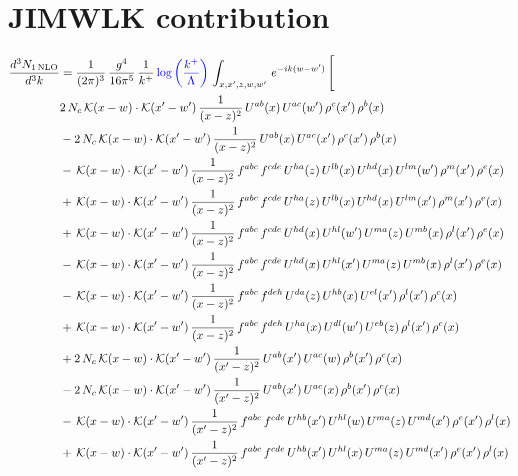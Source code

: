 \documentclass[9pt]{article}
\numberwithin{equation}{section}
\begin{document}
\section{JIMWLK contribution}
\begin{align}
\frac{d^{3}N_{1\,\mathrm{NLO}}}{d^{3}k} & = \frac{1}{(2\pi)^{3}}\,\frac{g^{4}}{16\pi^{5}}\,\frac{1}{k^{+}}\,{\color{blue}\log{\left(\frac{k^{+}}{\Lambda}\right)}}\,\int_{x,x',z,w,w'}\,e^{-ik(w-w')}\,\Bigg[\notag\\
&2\,N_{c}\,\mathcal{K}(x-w)\cdot\mathcal{K}(x'-w')\,\frac{1}{(x-z)^{2}}\,U^{ab}(x)\,U^{ac}(w')\,\rho^{c}(x')\,\rho^{b}(x)\notag\\
&-2\,N_{c}\,\mathcal{K}(x-w)\cdot\mathcal{K}(x'-w')\,\frac{1}{(x-z)^{2}}\,U^{ab}(x)\,U^{ac}(x')\,\rho^{c}(x')\,\rho^{b}(x)\notag\\
&-\,\mathcal{K}(x-w)\cdot\mathcal{K}(x'-w')\,\frac{1}{(x-z)^{2}}\,f^{abc}\,f^{cde}\,U^{ha}(z)\,U^{lb}(x)\,U^{hd}(x)\,U^{lm}(w')\,\rho^{m}(x')\,\rho^{e}(x)\notag\\
&+\,\mathcal{K}(x-w)\cdot\mathcal{K}(x'-w')\,\frac{1}{(x-z)^{2}}\,f^{abc}\,f^{cde}\,U^{ha}(z)\,U^{lb}(x)\,U^{hd}(x)\,U^{lm}(x')\,\rho^{m}(x')\,\rho^{e}(x)\notag\\
&+\,\mathcal{K}(x-w)\cdot\mathcal{K}(x'-w')\,\frac{1}{(x-z)^{2}}\,f^{abc}\,f^{cde}\,U^{hd}(x)\,U^{hl}(w')\,U^{ma}(z)\,U^{mb}(x)\,\rho^{l}(x')\,\rho^{e}(x)\notag\\
&-\,\mathcal{K}(x-w)\cdot\mathcal{K}(x'-w')\,\frac{1}{(x-z)^{2}}\,f^{abc}\,f^{cde}\,U^{hd}(x)\,U^{hl}(x')\,U^{ma}(z)\,U^{mb}(x)\,\rho^{l}(x')\,\rho^{e}(x)\notag\\
&-\,\mathcal{K}(x-w)\cdot\mathcal{K}(x'-w')\,\frac{1}{(x-z)^{2}}\,f^{abc}\,f^{deh}\,U^{da}(z)\,U^{hb}(x)\,U^{el}(x')\,\rho^{l}(x')\,\rho^{c}(x)\notag\\
&+\,\mathcal{K}(x-w)\cdot\mathcal{K}(x'-w')\,\frac{1}{(x-z)^{2}}\,f^{abc}\,f^{deh}\,U^{ha}(x)\,U^{dl}(w')\,U^{eb}(z)\,\rho^{l}(x')\,\rho^{c}(x)\notag\\
&+2\,N_{c}\,\mathcal{K}(x-w)\cdot\mathcal{K}(x'-w')\,\frac{1}{(x'-z)^{2}}\,U^{ab}(x')\,U^{ac}(w)\,\rho^{b}(x')\,\rho^{c}(x)\notag\\
&-2\,N_{c}\,\mathcal{K}(x-w)\cdot\mathcal{K}(x'-w')\,\frac{1}{(x'-z)^{2}}\,U^{ab}(x')\,U^{ac}(x)\,\rho^{b}(x')\,\rho^{c}(x)\notag\\
&-\,\mathcal{K}(x-w)\cdot\mathcal{K}(x'-w')\,\frac{1}{(x'-z)^{2}}\,f^{abc}\,f^{cde}\,U^{hb}(x')\,U^{hl}(w)\,U^{ma}(z)\,U^{md}(x')\,\rho^{e}(x')\,\rho^{l}(x)\notag\\
&+\,\mathcal{K}(x-w)\cdot\mathcal{K}(x'-w')\,\frac{1}{(x'-z)^{2}}\,f^{abc}\,f^{cde}\,U^{hb}(x')\,U^{hl}(x)\,U^{ma}(z)\,U^{md}(x')\,\rho^{e}(x')\,\rho^{l}(x)\notag\\

\end{align}
\end{document}
